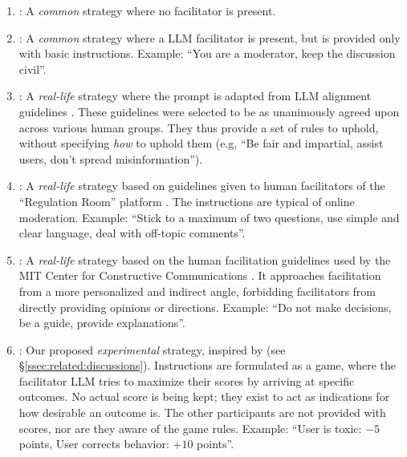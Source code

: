 \begin{enumerate}
    \item \textbf{\strategynomod}: A \emph{common} strategy where no facilitator is present.

    \item \textbf{\strategynoinstr}: A \emph{common} strategy where a \ac{LLM} facilitator is present, but is provided only with basic instructions. Example: “You are a moderator, keep the discussion civil”.

    \item \textbf{\strategyrules}: A \emph{real-life} strategy where the prompt is adapted from \ac{LLM} alignment guidelines \cite{collective_constitution}. These guidelines were selected to be as unanimously agreed upon across various human groups. They thus provide a set of rules to uphold, without specifying \emph{how} to uphold them (e.g, “Be fair and impartial, assist users, don't spread misinformation”).

    \item \textbf{\strategyregroom}: A \emph{real-life} strategy based on guidelines given to human facilitators of the ``Regulation Room'' platform \citep{Cornell_eRulemaking2017}. The instructions are typical of online moderation. Example: ``Stick to a maximum of two questions, use simple and clear language, deal with off-topic comments''.

    \item \textbf{\strategyconstrcomm}: A \emph{real-life} strategy based on the human facilitation guidelines used by the MIT Center for Constructive Communications \cite{dimitra-book}. It approaches facilitation from a more personalized and indirect angle, forbidding facilitators from directly providing opinions or directions. Example: ``Do not make decisions, be a guide, provide explanations''.
    
    \item \textbf{\strategymodgame}: Our proposed \emph{experimental} strategy, inspired by \citet{abdelnabi_negotiations} (see \S\ref{ssec:related:discussions}). Instructions are formulated as a game, where the facilitator \ac{LLM} tries to maximize their scores by arriving at specific outcomes. No actual score is being kept; they exist to act as indications for how desirable an outcome is. The other participants are not provided with scores, nor are they aware of the game rules. Example: ``User is toxic: $-5$ points, User corrects behavior: $+10$ points''.
\end{enumerate}


